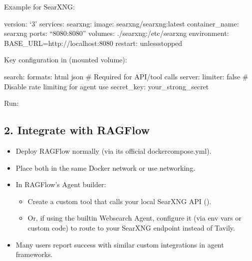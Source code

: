 \documentclass[letterpaper,10pt,english]{sphinxmanual}
\begin{document}
\sphinxAtStartPar
Example  for SearXNG:

\begin{sphinxVerbatim}[commandchars=\\\{\}]

\end{sphinxVerbatim}

\sphinxAtStartPar
version: ‘3’ services: searxng: image: searxng/searxng:latest
container\_name: searxng ports: \sphinxhyphen{} “8080:8080” volumes: \sphinxhyphen{}
./searxng:/etc/searxng environment: \sphinxhyphen{} BASE\_URL=http://localhost:8080
restart: unless\sphinxhyphen{}stopped

\sphinxAtStartPar
Key configuration in  (mounted volume):

\begin{sphinxVerbatim}[commandchars=\\\{\}]

\end{sphinxVerbatim}

\sphinxAtStartPar
search: formats: \sphinxhyphen{} html \sphinxhyphen{} json \# Required for API/tool calls server:
limiter: false \# Disable rate limiting for agent use secret\_key:
your\_strong\_secret

\sphinxAtStartPar
Run: 


\subsection{2. Integrate with RAGFlow}
\label{\detokenize{searxng:integrate-with-ragflow}}\begin{itemize}
\item {} 
\sphinxAtStartPar
Deploy RAGFlow normally (via its official docker\sphinxhyphen{}compose.yml).

\item {} 
\sphinxAtStartPar
Place both in the same Docker network or use  networking.

\item {} 
\sphinxAtStartPar
In RAGFlow’s Agent builder:
\begin{itemize}
\item {} 
\sphinxAtStartPar
Create a custom tool that calls your local SearXNG API
().

\item {} 
\sphinxAtStartPar
Or, if using the built\sphinxhyphen{}in Websearch Agent, configure it (via env
vars or custom code) to route to your SearXNG endpoint instead of
Tavily.

\end{itemize}

\item {} 
\sphinxAtStartPar
Many users report success with similar custom integrations in agent
frameworks.

\end{itemize}
\end{document}
